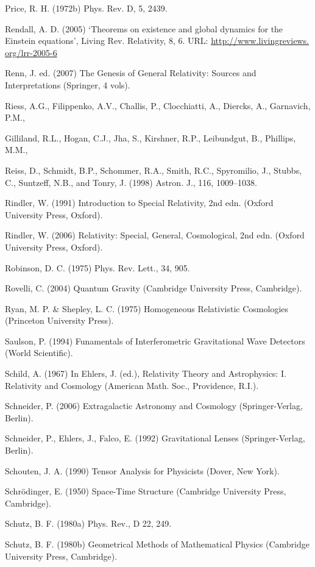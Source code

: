 {Price, R. H. (1972b) Phys. Rev. D, 5, 2439.


Rendall, A. D. (2005) ‘Theorems on existence and global dynamics for the Einstein equations’, Living Rev. Relativity, 8, 6. URL: \url{http://www.livingreviews.
org/lrr-2005-6}


Renn, J. ed. (2007) The Genesis of General Relativity: Sources and Interpretations (Springer, 4 vols).


Riess, A.G., Filippenko, A.V., Challis, P., Clocchiatti, A., Diercks, A., Garnavich, P.M.,


Gilliland, R.L., Hogan, C.J., Jha, S., Kirshner, R.P., Leibundgut, B., Phillips, M.M.,


Reiss, D., Schmidt, B.P., Schommer, R.A., Smith, R.C., Spyromilio, J., Stubbs, C., Suntzeff, N.B., and Tonry, J. (1998) Astron. J., 116, 1009–1038.


Rindler, W. (1991) Introduction to Special Relativity, 2nd edn. (Oxford University Press, Oxford).


Rindler, W. (2006) Relativity: Special, General, Cosmological, 2nd edn. (Oxford University Press, Oxford).


Robinson, D. C. (1975) Phys. Rev. Lett., 34, 905.


Rovelli, C. (2004) Quantum Gravity (Cambridge University Press, Cambridge).


Ryan, M. P. \& Shepley, L. C. (1975) Homogeneous Relativistic Cosmologies (Princeton University Press).


Saulson, P. (1994) Funamentals of Interferometric Gravitational Wave Detectors (World Scientific).


Schild, A. (1967) In Ehlers, J. (ed.), Relativity Theory and Astrophysics: I. Relativity and Cosmology (American Math. Soc., Providence, R.I.).


Schneider, P. (2006) Extragalactic Astronomy and Cosmology (Springer-Verlag, Berlin).


Schneider, P., Ehlers, J., Falco, E. (1992) Gravitational Lenses (Springer-Verlag, Berlin).


Schouten, J. A. (1990) Tensor Analysis for Physicists (Dover, New York).


Schrödinger, E. (1950) Space-Time Structure (Cambridge University Press, Cambridge).


Schutz, B. F. (1980a) Phys. Rev., D 22, 249.


Schutz, B. F. (1980b) Geometrical Methods of Mathematical Physics (Cambridge University Press, Cambridge).


}
